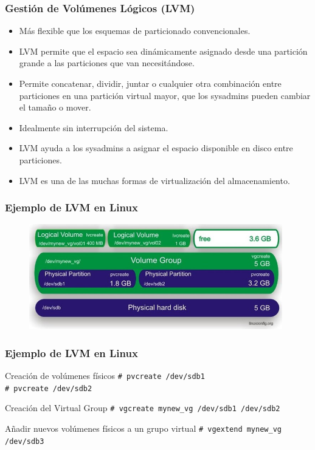 \documentclass{beamer}
\begin{document}
\begin{frame}
  \frametitle{Gestión de Volúmenes Lógicos (LVM)}
  \begin{itemize}
    \item Más flexible que los esquemas de particionado convencionales. 
    \item LVM permite que el espacio sea dinámicamente asignado desde una partición grande a las particiones que van necesitándose.
    \item Permite concatenar, dividir, juntar o cualquier otra combinación entre particiones en una partición virtual mayor, que los sysadmins pueden cambiar el tamaño o mover.
    \item Idealmente sin interrupción del sistema.
    \item LVM ayuda a los sysadmins a asignar el espacio disponible en disco entre particiones.
    \item LVM es una de las muchas formas de virtualización del almacenamiento. 
  \end{itemize}
\end{frame}

\begin{frame}
  \frametitle{Ejemplo de LVM en Linux}
\begin{figure}[h]
\begin{center}
  \includegraphics[width=11cm]{figs/lvm.png}
\end{center}
\end{figure}
\end{frame}

\begin{frame}
  \frametitle{Ejemplo de LVM en Linux}

\begin{block}{Creación de volúmenes físicos}
  \texttt{\# pvcreate /dev/sdb1} \\
  \texttt{\# pvcreate /dev/sdb2}
\end{block}

\begin{block}{Creación del Virtual Group}
  \texttt{\# vgcreate mynew\_vg /dev/sdb1 /dev/sdb2 }
\end{block}

\begin{block}{Añadir nuevos volúmenes físicos a un grupo virtual}
  \texttt{\# vgextend mynew\_vg /dev/sdb3 } 
\end{block}

\end{frame}
\end{document}
